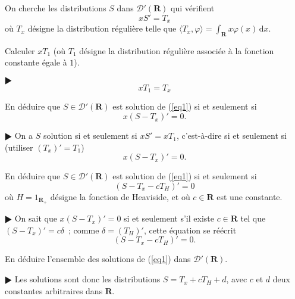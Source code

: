 \documentclass[11pt,a4paper]{article}
\def\R{\mathbf{R}}
\def\DD{\mathscr{D}}
\def\d{\mathrm{d}}
\def\vphi{\varphi}
\def\la{\langle}
\def\ra{\rangle}
\theoremstyle{plain}
\theoremstyle{definition}
\begin{document}
\begin{Exercice}[5 points]
On cherche les distributions $S$ dans $\DD'(\R)$ qui v\'erifient
\begin{equation} \label{eq1} 
  xS'=T_{x}
\end{equation}
o\`u $T_x$ d\'esigne la distribution r\'eguli\`ere telle que
$\la T_x,\vphi \ra = \int_\R x\vphi(x)\,\d x$.

\begin{Question} Calculer $xT_1$ (o\`u $T_1$ d\'esigne la distribution r\'eguli\`ere
associ\'ee \`a la fonction constante \'egale \`a $1$).
\end{Question}

\begin{corr} $\RHD$
\[ xT_1=T_x \]
\end{corr}

\begin{Question} En d\'eduire que  $S \in \DD'(\R)$ est solution de (\ref{eq1}) si et
seulement si
\[ x(S-T_x)'=0. \]
\end{Question}

\begin{corr} $\RHD$ On a $S$ solution si et seulement si $xS'=xT_1$,
c'est-\`a-dire si et seulement si (utiliser $(T_x)'=T_1$)
\[ x(S-T_x)'=0. \]
\end{corr}

\begin{Question} En d\'eduire que $S \in \DD'(\R)$ est solution de (\ref{eq1}) si et
seulement si
\[ (S-T_x-cT_H)' = 0 \]
o\`u $H=1_{\mathbf{R}_+}$ d\'esigne la fonction de Heaviside, et o\`u $c \in \R$ est
une constante.
\end{Question}

\begin{corr} $\RHD$ On sait que $x(S-T_x)'=0$ si et seulement s'il existe
$c \in \R$ tel que $(S-T_x)'=c\delta$~; comme $\delta=(T_H)'$, cette \'equation
se r\'e\'ecrit
\[ (S-T_x-cT_H)'=0. \]
\end{corr}

\begin{Question} En d\'eduire l'ensemble des solutions de (\ref{eq1}) dans $\DD'(\R)$.
\end{Question}

\begin{corr} $\RHD$ Les solutions sont donc les distributions
$S=T_x+cT_H+d$, avec $c$ et $d$ deux constantes arbitraires dans $\R$.
\end{corr}

\end{Exercice} \vspace*{1em}
\end{document}
